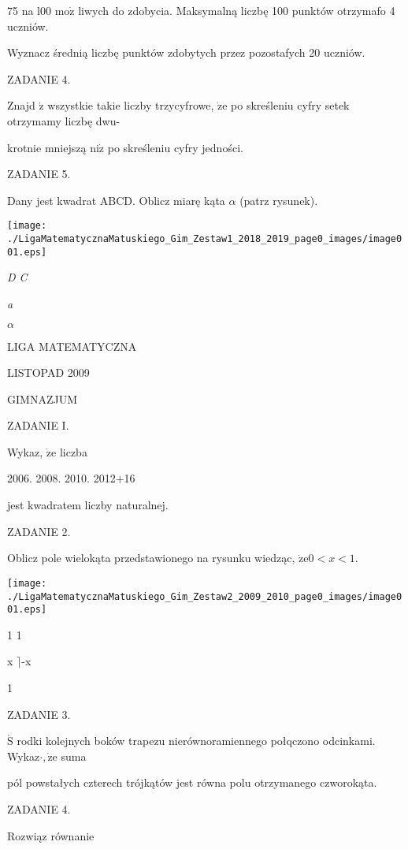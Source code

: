 \documentclass[a4paper,12pt]{article}
\begin{document}
75 na l00 $\mathrm{m}\mathrm{o}\dot{\mathrm{z}}$ liwych do zdobycia. Maksymalną liczbę 100 punktów otrzymafo 4 uczniów.

Wyznacz średnią liczbę punktów zdobytych przez pozostafych 20 uczniów.

ZADANIE 4.

Znajd $\acute{\mathrm{z}}$ wszystkie takie liczby trzycyfrowe, $\dot{\mathrm{z}}\mathrm{e}$ po skreśleniu cyfry setek otrzymamy liczbę dwu-

krotnie mniejszą $\mathrm{n}\mathrm{i}\dot{\mathrm{z}}$ po skreśleniu cyfry jedności.

ZADANIE 5.

Dany jest kwadrat ABCD. Oblicz miarę kąta $\alpha$ (patrz rysunek).
\begin{center}
\texttt{[image: ./LigaMatematycznaMatuskiego\_Gim\_Zestaw1\_2018\_2019\_page0\_images/image001.eps]}
\end{center}
{\it D  C}

{\it a}

$\alpha$






LIGA MATEMATYCZNA

LISTOPAD 2009

GIMNAZJUM

ZADANIE I.

Wykaz, $\dot{\mathrm{z}}\mathrm{e}$ liczba

2006. 2008. 2010. 2012$+$16

jest kwadratem liczby naturalnej.

ZADANIE 2.

Oblicz pole wielokąta przedstawionego na rysunku wiedząc, $\dot{\mathrm{z}}\mathrm{e}0<x<1.$
\begin{center}
\texttt{[image: ./LigaMatematycznaMatuskiego\_Gim\_Zestaw2\_2009\_2010\_page0\_images/image001.eps]}
\end{center}
1  1

x  $\rceil$-x

1

ZADANIE 3.

$\acute{\mathrm{S}}$ rodki kolejnych boków trapezu nierównoramiennego połqczono odcinkami. Wykaz$\cdot, \dot{\mathrm{z}}\mathrm{e}$ suma

pól powstałych czterech trójkątów jest równa polu otrzymanego czworokąta.

ZADANIE 4.

Rozwiąz równanie
\end{document}
